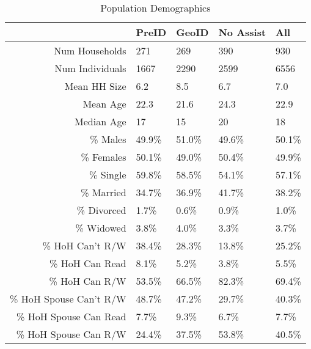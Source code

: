 \begin{table}[ht]
\centering
\begin{tabular}{rllll}
  \hline
 & PreID & GeoID & No Assist & All \\ 
  \hline
Num Households & 271 & 269 & 390 & 930 \\ 
  Num Individuals & 1667 & 2290 & 2599 & 6556 \\ 
  Mean HH Size & 6.2 & 8.5 & 6.7 & 7.0 \\ 
  Mean Age & 22.3 & 21.6 & 24.3 & 22.9 \\ 
  Median Age & 17 & 15 & 20 & 18 \\ 
  \% Males & 49.9\% & 51.0\% & 49.6\% & 50.1\% \\ 
  \% Females & 50.1\% & 49.0\% & 50.4\% & 49.9\% \\ 
  \% Single & 59.8\% & 58.5\% & 54.1\% & 57.1\% \\ 
  \% Married & 34.7\% & 36.9\% & 41.7\% & 38.2\% \\ 
  \% Divorced & 1.7\% & 0.6\% & 0.9\% & 1.0\% \\ 
  \% Widowed & 3.8\% & 4.0\% & 3.3\% & 3.7\% \\ 
  \% HoH Can't R/W & 38.4\% & 28.3\% & 13.8\% & 25.2\% \\ 
  \% HoH Can Read & 8.1\% & 5.2\% & 3.8\% & 5.5\% \\ 
  \% HoH Can R/W & 53.5\% & 66.5\% & 82.3\% & 69.4\% \\ 
  \% HoH Spouse Can't R/W & 48.7\% & 47.2\% & 29.7\% & 40.3\% \\ 
  \% HoH Spouse Can Read & 7.7\% & 9.3\% & 6.7\% & 7.7\% \\ 
  \% HoH Spouse Can R/W & 24.4\% & 37.5\% & 53.8\% & 40.5\% \\ 
   \hline
\end{tabular}
\caption{Population Demographics} 
\end{table}
